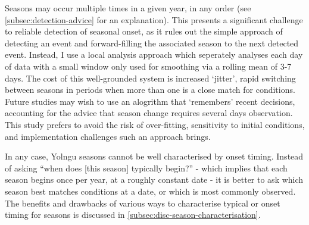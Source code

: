 Seasons may occur multiple times in a given year, in any order (see
\cref{subsec:detection-advice} for an explanation).  This presents a significant
challenge to reliable detection of seasonal onset, as it rules out
the simple approach of detecting an event and forward-filling the
associated season to the next detected event.  Instead, I use a local
analysis approach which seperately analyses each day of data with
a small window only used for smoothing via a rolling mean of 3-7 days.
%
The cost of this well-grounded system is increased `jitter', rapid
switching between seasons in periods when more than one is a close match
for conditions.  Future studies may wish to use an alogrithm that `remembers'
recent decisions, accounting for the advice that season change requires
several days observation.  This study prefers to avoid the risk of
over-fitting, sensitivity to initial conditions, and implementation
challenges such an approach brings.

In any case, Yolngu seasons cannot be well characterised by onset timing.
Instead of asking ``when does [this season] typically begin?'' - which implies
that each season begins once per year, at a roughly constant date -
it is better to ask which season best matches conditions at a date,
or which is most commonly observed.
%
The benefits and drawbacks of various ways to characterise typical or onset
timing for seasons is discussed in \cref{subsec:disc-season-characterisation}.

